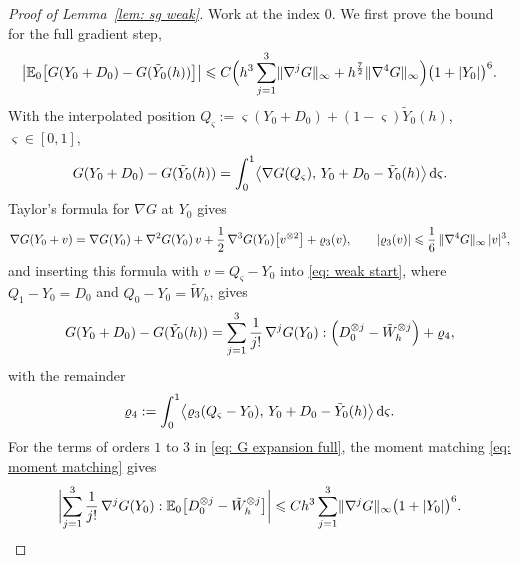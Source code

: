 \begin{proof}[Proof of Lemma~\ref{lem: sg weak}]
    Work at the index $0$. We first prove the bound for the full gradient step,
    \begin{equation}
        \bigl| \mathbb E_0\bigl[ G(Y_0 + D_0) - G(\tilde Y_0(h)) \bigr] \bigr| \leqslant C \Bigl( h^3 \sum_{j=1}^{3} \lVert \nabla^j G \rVert_\infty + h^{\frac72} \lVert \nabla^4 G \rVert_\infty \Bigr) \bigl( 1+|Y_0| \bigr)^6 .
        \label{eq: weak}
    \end{equation}
    With the interpolated position $Q_\varsigma := \varsigma ( Y_0 + D_0 ) + (1 - \varsigma) \tilde Y_0(h)$, $\varsigma \in [0,1]$,
    \begin{equation}
        G(Y_0 + D_0) - G(\tilde Y_0(h)) = \int_0^1 \bigl\langle \nabla G(Q_\varsigma),\, Y_0 + D_0 - \tilde Y_0(h) \bigr\rangle \,\mathrm{d}\varsigma .
        \label{eq: weak start}
    \end{equation}
    Taylor's formula for $\nabla G$ at $Y_0$ gives
    \begin{equation*}
        \nabla G(Y_0 + v) = \nabla G(Y_0) + \nabla^2 G(Y_0)\, v + \frac12\, \nabla^3 G(Y_0)\bigl[ v^{\otimes2} \bigr] + \varrho_3(v) ,
        \qquad |\varrho_3(v)| \leqslant \frac16\, \lVert \nabla^4 G \rVert_\infty\, |v|^3 ,
    \end{equation*}
    and inserting this formula with $v = Q_\varsigma - Y_0$ into \eqref{eq: weak start}, where $Q_1 - Y_0 = D_0$ and $Q_0 - Y_0 = \tilde W_h$, gives
    \begin{equation}
        G(Y_0 + D_0) - G(\tilde Y_0(h)) = \sum_{j=1}^{3} \frac{1}{j!}\, \nabla^j G(Y_0) : \Bigl( D_0^{\otimes j} - \tilde W_h^{\otimes j} \Bigr) + \varrho_4 ,
        \label{eq: G expansion full}
    \end{equation}
    with the remainder
    \begin{equation*}
        \varrho_4 := \int_0^1 \bigl\langle \varrho_3(Q_\varsigma - Y_0),\, Y_0 + D_0 - \tilde Y_0(h) \bigr\rangle \,\mathrm{d}\varsigma .
    \end{equation*}
    For the terms of orders $1$ to $3$ in \eqref{eq: G expansion full}, the moment matching \eqref{eq: moment matching} gives
    \begin{equation}
        \biggl| \sum_{j=1}^{3} \frac{1}{j!}\, \nabla^j G(Y_0) : \mathbb E_0\bigl[ D_0^{\otimes j} - \tilde W_h^{\otimes j} \bigr] \biggr|
        \leqslant C h^3 \sum_{j=1}^{3} \lVert \nabla^j G \rVert_\infty \bigl( 1 + |Y_0| \bigr)^{6} .
        \label{eq: weak matched}
    \end{equation}


\end{proof}
